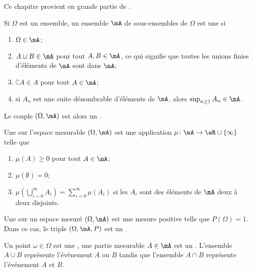 Ce chapitre provient en grande partie de \cite{ProbaDanielLi}.

\begin{definition}
    Si \( \Omega\) est un ensemble, un ensemble \( \mA\) de sous-ensembles de \( \Omega\) est une  si
    \begin{enumerate}
        \item
            \( \Omega\in\mA\);
        \item
            \( A\cup B\in\mA\) pour tout \( A,B\in\mA\), ce qui signifie que toutes les unions finies d'éléments de \( \mA\) sont dans \( \mA\);
        \item
            \( \complement A\in A\) pour tout \( A\in\mA\);
        \item
            si \( A_n\) est une suite dénombrable d'éléments de \( \mA\), alors \( \sup_{n\geq 1}A_n\in\mA\).
    \end{enumerate}
    Le couple \( (\Omega,\mA)\) est alors un .
\end{definition}

Une  sur l'espace mesurable \( (\Omega,\mA)\) est une application \( \mu\colon \mA\to \eR\cup\{ \infty \}\) telle que
\begin{enumerate}
    \item
        \( \mu(A)\geq 0\) pour tout \( A\in\mA\);
    \item
        \( \mu(\emptyset)=0\);
    \item
        \( \mu\left( \bigcup_{i=0}^{\infty}A_i\right)=\sum_{i=0}^{\infty}\mu(A_i)\) si les \( A_i\) sont des éléments de \( \mA\) deux à deux disjoints.
\end{enumerate}

Une  sur un espace mesuré \( (\Omega,\mA)\) est une mesure positive telle que \( P(\Omega)=1\). Dans ce cas, le triple \( (\Omega,\mA,P)\) est un .

Un point \( \omega\in\Omega\) est une , une partie mesurable \( A\in\mA\) est un . L'ensemble \( A\cup B\) représente l'événement \( A\) ou \( B\) tandis que l'ensemble \( A\cap B\) représente l'événement \( A\) et \( B\).




